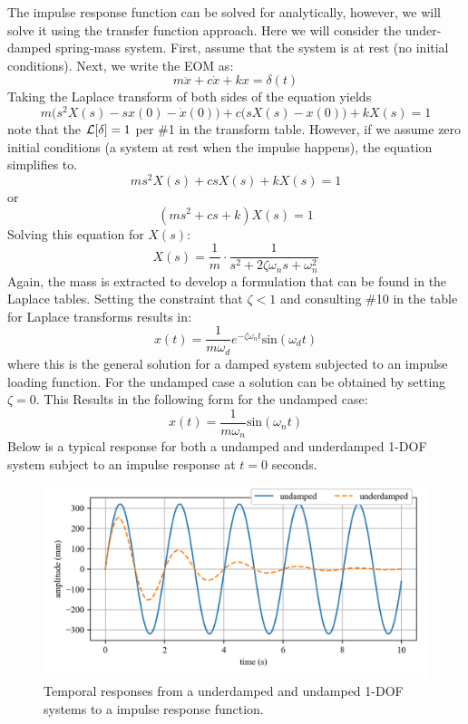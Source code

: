 \documentclass[12pt,letter]{article}
\begin{document}
			The impulse response function can be solved for analytically, however, we will solve it using the transfer function approach. Here we will consider the under-damped spring-mass system. First, assume that the system is at rest (no initial conditions). Next, we write the EOM as:
			\begin{equation}
			m\ddot{x} +c\dot{x} +kx = \delta(t)
			\end{equation}
			Taking the Laplace transform of both sides of the equation yields 
			\begin{equation}
			m\big(s^2X(s)-sx(0) - \dot{x}(0)\big) + c\big(sX(s)-x(0)\big) +kX(s) =1
			\end{equation}
			note that the $\mathcal{L}{\left[\delta\right]}=1$ per \#1 in the transform table. However, if we assume zero initial conditions (a system at rest when the impulse happens), the equation simplifies to. 
			\begin{equation}
			ms^2X(s) + csX(s) +kX(s) =1
			\end{equation}
			or
			\begin{equation}
			(ms^2 + cs +k)X(s) =1
			\end{equation}
			Solving this equation for $X(s)$:
			\begin{equation}
			X(s) = \frac{1}{m} \cdot \frac{1}{s^2 + 2 \zeta \omega_n s + \omega_n^2}
			\end{equation}
			Again, the mass is extracted to develop a formulation that can be found in the Laplace tables. Setting the constraint that $\zeta<1$ and consulting \#10 in the table for Laplace transforms results in:
			\begin{equation}
			x(t) = \frac{1}{m \omega_d} e^{-\zeta \omega_n t} \text{sin}(\omega_dt)
			\end{equation}
			where this is the general solution for a damped system subjected to an impulse loading function. For the undamped case a solution can be obtained by setting $\zeta=0$. This Results in the following form for the undamped case:
			\begin{equation}
			x(t) = \frac{1}{m \omega_n}\text{sin}(\omega_n t)
			\end{equation}
			Below is a typical response for both a undamped and underdamped 1-DOF system subject to an impulse response at $t=0$ seconds. 
			\begin{figure}[H]
				\centering
				\includegraphics[]{../figures/response_impulse.png}
				\caption{Temporal responses from a underdamped and undamped 1-DOF systems to a impulse response function.}
			\end{figure}
\end{document}
